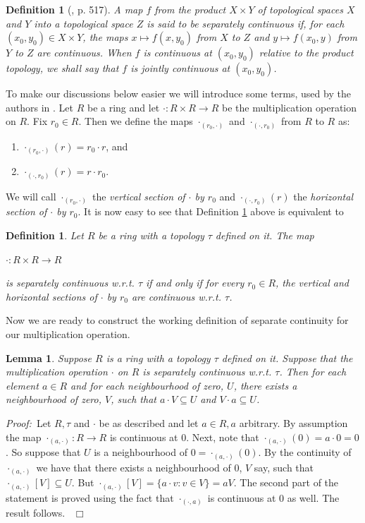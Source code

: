 \documentclass[12pt, oneside]{book}
\newtheorem{lemma}[theorem]{Lemma}
\newtheorem{definition}[theorem]{Definition}
\newcommand{\proof}{{\noindent \it Proof:~}}
\newcommand{\qed}{\hfill ~$\Box$\\}
\begin{document}
\begin{definition} [\cite{Namioka}, p. 517] \label{DefJointConty}
\normalfont
A map $f$ from the product $X \times Y$ of topological spaces $X$ and $Y$ into a topological space $Z$ 
is said to be {\sl separately continuous} if, for each $(x_0, y_0) \in X \times Y$, 
the maps $x \mapsto f(x,y_0)$ from $X$ to $Z$ and $y \mapsto f(x_0, y)$ from $Y$ to $Z$ are 
continuous. When $f$ is continuous at $(x_0, y_0)$ relative to the product topology, we shall say that 
$f$ is {\sl jointly continuous} at $(x_0, y_0)$.
\end{definition}

\noindent To make our discussions below easier we will introduce some terms, used by the authors in
 \cite{Henriksen}.
\vskip 0.3cm
\noindent Let $R$ be a ring and let $\cdot : R \times R \rightarrow R$ be the multiplication operation 
on $R$. Fix $r_0 \in R$. Then we define the maps $\cdot_{(r_0, \cdot)}$ and $\cdot_{(\cdot, r_0)}$ from $R$ to $R$ as:
\begin{enumerate}[label=(\alph*)]
\item $\cdot_{(r_0, \cdot)}(r) = r_0 \cdot r$, and
\item $\cdot_{(\cdot, r_0)}(r) = r \cdot r_0$.
\end{enumerate}
\noindent We will call $\cdot_{(r_0, \cdot)}$ the {\sl vertical section of $\cdot$ by $r_0$} and 
$\cdot_{(\cdot, r_0)}(r)$ the {\sl horizontal section of $\cdot$ by $r_0$}.
\vskip 0.3cm
\noindent It is now easy to see that Definition \ref{DefJointConty} above is equivalent to 
\begin{definition}
\normalfont
\noindent Let $R$ be a ring with a topology $\tau$ defined on it. The map 
\begin{center}
$\cdot : R \times R \rightarrow R$ 
\end{center}
is separately continuous w.r.t. $\tau$ if and only if for every $r_0 \in R$, 
the vertical and horizontal sections of $\cdot$ by $r_0$ are continuous w.r.t. $\tau$.
\end{definition}
\noindent Now we are ready to construct the working definition of separate continuity for our
 multiplication operation.
\begin{lemma}
\normalfont
\noindent Suppose $R$ is a ring with a topology $\tau$ defined on it. Suppose that the multiplication
operation $\cdot$ on $R$ is separately continuous w.r.t. $\tau$. Then for each element $a \in R$ and 
for each neighbourhood of zero, $U$, there exists a neighbourhood of zero, $V$, such that 
$a \cdot V \subseteq U$ and $V \cdot a \subseteq U$.
\end{lemma}
\proof \space Let $R, \tau$ and $\cdot$ be as described and let $a \in R, a$ arbitrary. By assumption the 
map $\cdot_{(a, \cdot)}: R \rightarrow R$ is continuous at $0$. 
Next, note that $\cdot_{(a, \cdot)}(0) = a\cdot 0 = 0$. 
So suppose that $U$ is a neighbourhood of $0 = \cdot_{(a, \cdot)}(0)$. By the continuity of 
$\cdot_{(a, \cdot)}$ we have that there exists a neighbourhood of $0$, $V$ say, such that 
$\cdot_{(a, \cdot)}[V] \subseteq U$. But $\cdot_{(a, \cdot)}[V] = \{ a \cdot v : v \in V \} = aV$. 
The second part of the statement is proved using the fact that $\cdot_{(\cdot, a)}$ is continuous at $0$
as well. The result follows. \qed
\end{document}
